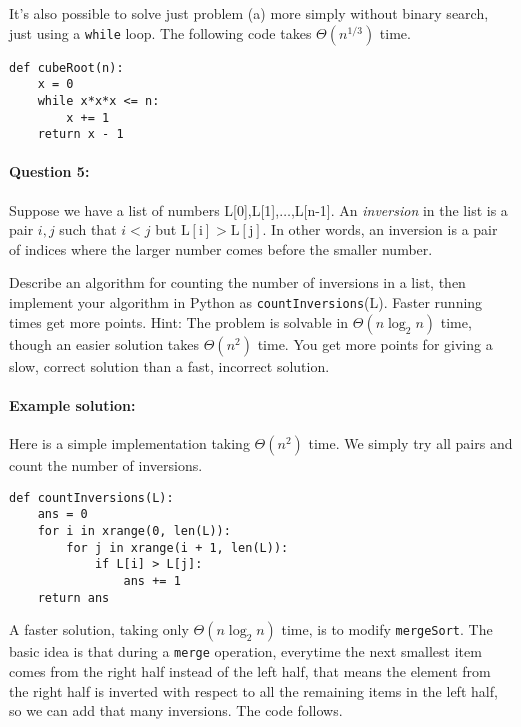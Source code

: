 \documentclass[11pt]{article}
\begin{document}
It's also possible to solve just problem (a) more simply without
binary search, just using a \texttt{while} loop.  The following code
takes $\Theta(n^{1/3})$ time.

\begin{verbatim}
def cubeRoot(n):
    x = 0
    while x*x*x <= n:
        x += 1
    return x - 1
\end{verbatim}

\paragraph{Question 5:}
Suppose we have a list of numbers L[0],L[1],$\ldots$,L[n-1].  An
{\em inversion} in the list is a pair $i,j$ such that $i<j$ but
$\mathrm{L[i]}> \mathrm{L[j]}$.  In other words, an inversion is a
pair of indices where the larger number comes before the smaller
number.

Describe an algorithm for counting the number of inversions in a list,
then implement your algorithm in Python as
\texttt{countInversions}(L).  Faster running times get more points.
Hint: The problem is solvable in $\Theta(n\log_2 n)$ time, though an
easier solution takes $\Theta(n^2)$ time.  You get more points for
giving a slow, correct solution than a fast, incorrect solution.

\paragraph{Example solution:}
Here is a simple implementation taking $\Theta(n^2)$ time.  We simply
try all pairs and count the number of inversions.

\begin{verbatim}
def countInversions(L):
    ans = 0
    for i in xrange(0, len(L)):
        for j in xrange(i + 1, len(L)):
            if L[i] > L[j]:
                ans += 1
    return ans
\end{verbatim}

A faster solution, taking only $\Theta(n\log_2 n)$ time, is to modify
\texttt{mergeSort}.  The basic idea is that during a \texttt{merge}
operation, everytime the next smallest item comes from the right half
instead of the left half, that means the element from the right half
is inverted with respect to all the remaining items in the left half,
so we can add that many inversions.  The code follows.
\end{document}

